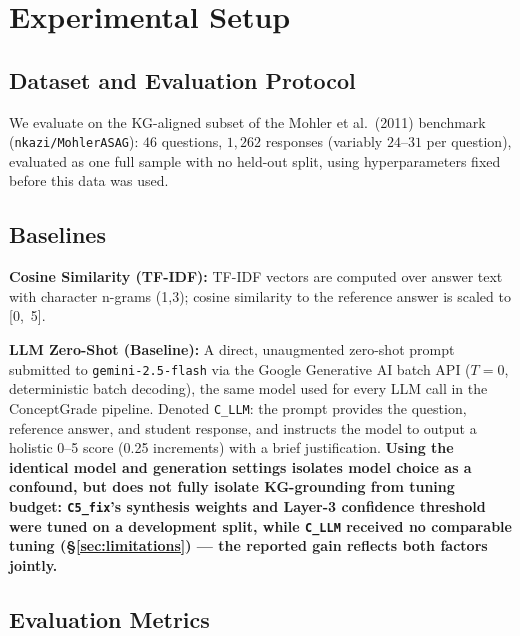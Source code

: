 \documentclass[conference]{IEEEtran}
\begin{document}
\section{Experimental Setup}

\subsection{Dataset and Evaluation Protocol}
\label{subsec:dataset_protocol}

We evaluate on the KG-aligned subset of the Mohler et al.\ (2011) benchmark (\texttt{nkazi/MohlerASAG}): $46$ questions, $1{,}262$ responses (variably $24$--$31$ per question), evaluated as one full sample with no held-out split, using hyperparameters fixed before this data was used.

\subsection{Baselines}

\textbf{Cosine Similarity (TF-IDF):} TF-IDF vectors are computed over answer text
with character n-grams (1,3); cosine similarity to the reference answer is scaled
to [0,~5].

\textbf{LLM Zero-Shot (Baseline):} A direct, unaugmented zero-shot
prompt submitted to \texttt{gemini-2.5-flash} \cite{geminiteam2025}
via the Google Generative AI batch API ($T=0$, deterministic batch
decoding), the same model used for every LLM call in the ConceptGrade
pipeline. Denoted \texttt{C\_LLM}: the prompt provides the question,
reference answer, and student response, and instructs the model to
output a holistic 0--5 score (0.25 increments) with a brief
justification. \textbf{Using the identical model and generation
settings isolates model choice as a confound, but does not fully
isolate KG-grounding from tuning budget: \texttt{C5\_fix}'s synthesis
weights and Layer-3 confidence threshold were tuned on a development
split, while \texttt{C\_LLM} received no comparable tuning
(\S\ref{sec:limitations}) --- the reported gain reflects both factors
jointly.}

\subsection{Evaluation Metrics}
\end{document}
